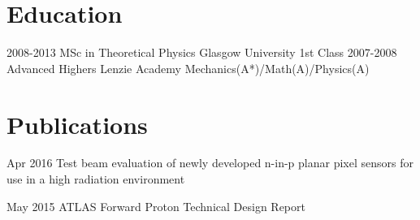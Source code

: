 \documentclass[]{twentysecondcv}
\begin{document}

\section*{Education}

\begin{twenty}
  \twentyitem
    {2008-2013}
    {MSc in Theoretical Physics }
    {Glasgow University}
    {1st Class}
  \twentyitem
    {2007-2008}
    {Advanced Highers}
    {Lenzie Academy}
    {Mechanics(A*)/Math(A)/Physics(A)}
\end{twenty}



\section*{Publications}

\begin{twentyshort}
  \twentyitemshort
    {Apr 2016}
    {Test beam evaluation of newly developed n-in-p planar pixel sensors for use in a high radiation environment}
\end{twentyshort}




\begin{twentyshort}
  \twentyitemshort
    {May 2015}
    {ATLAS Forward Proton Technical Design Report}
\end{twentyshort}
\end{document}
